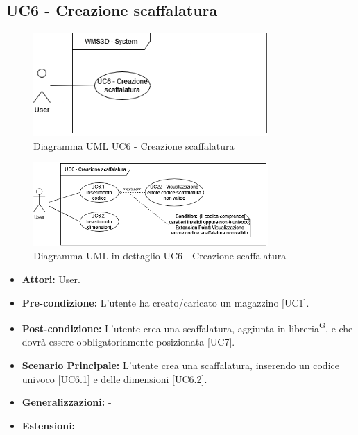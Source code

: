 \subsection{UC6 - Creazione scaffalatura}
\begin{figure}[H]
  \centering
  \includegraphics[width=0.8\textwidth]{UC_diagrams_1-10/UC6_sys.drawio.png}
   \caption{Diagramma UML UC6 - Creazione scaffalatura}
\end{figure}
\begin{figure}[H]
  \centering
  \includegraphics[width=0.8\textwidth]{UC_diagrams_1-10/UC6.drawio.png}
   \caption{Diagramma UML in dettaglio UC6 - Creazione scaffalatura}
\end{figure}
\begin{itemize}
    \item \textbf{Attori:} User.
    \item \textbf{Pre-condizione:}  L'utente ha creato/caricato un magazzino [UC1].
    \item \textbf{Post-condizione:} L'utente crea una scaffalatura, aggiunta in libreria\textsuperscript{G}, e che dovrà essere obbligatoriamente posizionata [UC7].
    \item \textbf{Scenario Principale:}  L'utente crea una scaffalatura, inserendo un codice univoco [UC6.1] e delle dimensioni [UC6.2].
    \item \textbf{Generalizzazioni:} -
    \item \textbf{Estensioni:} -
\end{itemize}


